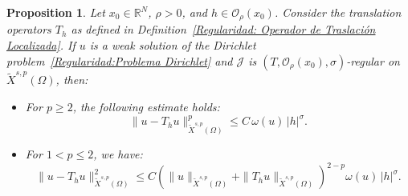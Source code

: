 \documentclass[]{amsart}
\newtheorem{proposition}[theorem]{Proposition}
\theoremstyle{definition}
\theoremstyle{definition}
\theoremstyle{remark}
\numberwithin{equation}{section}
\begin{document}
	
	\begin{proposition}
		\label{Regularidad: Regularity and minimizers}
		Let \( x_0 \in \mathbb{R}^N \), \( \rho > 0 \), and \( h \in \mathcal{O}_\rho(x_0) \). Consider the translation operators \( T_h \) as defined in Definition~\ref{Regularidad: Operador de Traslación Localizada}. If \( u \) is a weak solution of the Dirichlet problem~\eqref{Regularidad:Problema Dirichlet} and \( \mathcal{J} \) is \((T, \mathcal{O}_\rho(x_0), \sigma)\)-regular on \( \widetilde{X}^{s,p}(\Omega) \), then:
		\begin{itemize}
			\item For \( p \geq 2 \), the following estimate holds:
			\begin{equation}
					\label{eq: regularity and minimizers p>2}
			 \| u - T_h u \|_{\widetilde{X}^{s,p}(\Omega)}^p \leq C \, \omega(u) \, |h|^{\sigma}.
			\end{equation}
			
			\item For \( 1 < p \leq 2 \), we have:
\begin{equation}
	\label{eq: regularity and minimizers p<2}
				 \| u - T_h u \|_{\widetilde{X}^{s,p}(\Omega)}^2 \leq C \left( \| u \|_{\widetilde{X}^{s,p}(\Omega)} + \| T_h u \|_{\widetilde{X}^{s,p}(\Omega)} \right)^{2-p} \omega(u) \, |h|^{\sigma}.
\end{equation}
		\end{itemize}
	\end{proposition}
	
\end{document}
